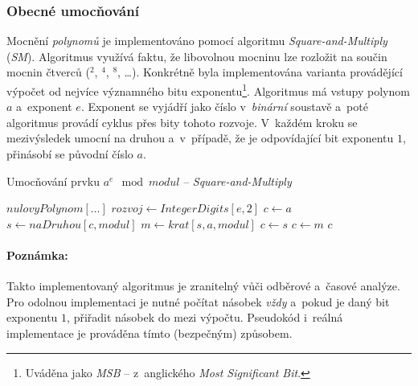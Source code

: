 \documentclass[thesis=M,czech,hidelinks]{FITthesis}[2012/06/26]
\newcommand{\0}{{\textcolor[gray]{0.75}{0}}}
\newenvironment{algoritmus}{
    \floatname{algorithm}{Algoritmus}
    \begin{algorithm}
}{\end{algorithm}}
\begin{document}
\subsubsection{Obecné umocňování}

Mocnění \emph{polynomů} je implementováno pomocí algoritmu
\emph{Square-and-Multiply} (\emph{SM}). Algoritmus využívá faktu, že libovolnou
mocninu lze rozložit na součin mocnin čtverců ($^2$, $^4$, $^8$, \ldots). Konkrétně
byla implementována varianta provádějící výpočet od nejvíce významného bitu
exponentu\footnote{
    Uváděna jako \emph{MSB} -- z~anglického \emph{Most Significant Bit}.
}. Algoritmus má vstupy polynom $a$ a~exponent $e$. Exponent se vyjádří jako
číslo v~\emph{binární} soustavě a~poté algoritmus provádí cyklus přes bity
tohoto rozvoje. V~každém kroku se mezivýsledek umocní na druhou a~v~případě, že
je odpovídající bit exponentu $1$, přinásobí se původní číslo $a$.


\begin{algoritmus}[!ht]
    \caption[Square-and-Multiply]{
        Umocňování prvku $a^e \mod modul$ -- \emph{Square-and-Multiply}
    }
    \begin{algorithmic}[1]
            \State \Return $nulovyPolynom[\ldots]$
        \EndIf
        \State $ rozvoj \gets IntegerDigits[ e, 2 ] $
        \State $ c \gets a $
            \State $ s \gets naDruhou[ c, modul ] $
            \State $ m \gets krat[ s, a, modul ] $
                \State $ c \gets s $
            \Else
                \State $ c \gets m $
            \EndIf
        \EndFor
        \State \Return $c$
     \EndFunction
    \end{algorithmic}
\end{algoritmus}


\paragraph{Poznámka:} Takto implementovaný algoritmus je zranitelný vůči
odběrové a~časové analýze. Pro odolnou implementaci je nutné počítat násobek
\emph{vždy} a~pokud je daný bit exponentu $1$, přiřadit násobek do mezi výpočtu.
Pseudokód i~reálná implementace je prováděna tímto (bezpečným) způsobem.

\vfil
\end{document}
